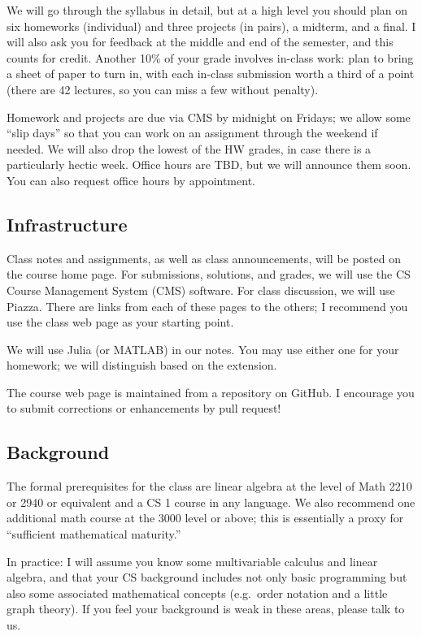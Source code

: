 \documentclass[12pt, leqno]{article}
\begin{document}
We will go through the syllabus in detail, but at a high level you
should plan on six homeworks (individual) and three projects (in
pairs), a midterm, and a final.  I will also ask you for feedback at
the middle and end of the semester, and this counts for credit.
Another 10\% of your grade involves in-class work: plan to bring a
sheet of paper to turn in, with each in-class submission worth a third
of a point (there are 42 lectures, so you can miss a few without
penalty).

Homework and projects are due via CMS by midnight on Fridays; we allow
some ``slip days'' so that you can work on an assignment through the
weekend if needed.  We will also drop the lowest of the HW grades, in
case there is a particularly hectic week.  Office hours are TBD,
but we will announce them soon.  You can also request office
hours by appointment.

\subsection{Infrastructure}

Class notes and assignments, as well as class announcements, will be
posted on the course home page.  For submissions, solutions, and
grades, we will use the CS Course Management System (CMS) software.
For class discussion, we will use Piazza.  There are links from each
of these pages to the others; I recommend you use the class web page
as your starting point.

We will use Julia (or MATLAB) in our notes.  You may use either one
for your homework; we will distinguish based on the extension.

The course web page is maintained from a repository on GitHub.
I encourage you to submit corrections or enhancements by pull
request!

\subsection{Background}

The formal prerequisites for the class are linear algebra at the level
of Math 2210 or 2940 or equivalent and a CS 1 course in any language.
We also recommend one additional math course at the 3000 level or
above; this is essentially a proxy for ``sufficient mathematical
maturity.''

In practice: I will assume you know some multivariable calculus
and linear algebra, and that your CS background includes not only
basic programming but also some associated mathematical concepts
(e.g.~order notation and a little graph theory).  If you feel your
background is weak in these areas, please talk to us.
\end{document}
